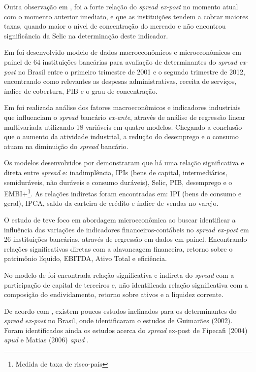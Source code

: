 \documentclass[
  12pt,
  12pt,
  openright,
  oneside,
  a4paper,
  chapter=TITLE,
  section=TITLE,
  subsection=TITLE,
  subsubsection=TITLE,
  english,
  portugues,
  sumario=tradicional]{abntex2}
\begin{document}
Outra observação em \textcite{dantas:2012}, foi a forte relação do \emph{spread} \emph{ex-post} no momento atual com o momento anterior imediato, e que as instituições tendem a cobrar maiores taxas, quando maior o nível de concentração do mercado e não encontrou significância da Selic na determinação deste indicador.

Em \textcite{almeida:2013} foi desenvolvido modelo de dados macroeconômicos e microeconômicos em painel de 64 instituições bancárias para avaliação de determinantes do \emph{spread} \emph{ex-post} no Brasil entre o primeiro trimestre de 2001 e o segundo trimestre de 2012, encontrando como relevantes as despesas administrativas, receita de serviços, índice de cobertura, PIB e o grau de concentração.

Em \textcite{durigan:2018} foi realizada análise dos fatores macroeconômicos e indicadores industriais que influenciam o \emph{spread} bancário \emph{ex-ante}, através de análise de regressão linear multivariada utilizando 18 variáveis em quatro modelos. Chegando a conclusão que o aumento da atividade industrial, a redução
do desemprego e o consumo atuam na diminuição do \emph{spread} bancário.

Os modelos desenvolvidos por \textcite{durigan:2018} demonstraram que há uma relação significativa e direta entre \emph{spread} e: inadimplência, IPIs (bens de capital, intermediários, semiduráveis, não duráveis e consumo duráveis), Selic, PIB, desemprego e o EMBI+\footnote{Medida de taxa de risco-país}. As relações indiretas foram encontradas em: IPI (bens de consumo e geral), IPCA, saldo da carteira de crédito e índice de vendas no varejo.

O estudo de \textcite{timotio:2018} teve foco em abordagem microeconômica ao buscar identificar a influência das variações de indicadores financeiros-contábeis no \emph{spread ex-post} em 26 instituições bancárias, através de regressão em dados em painel. Encontrando relações significativas diretas com a alavancagem financeira, retorno sobre o patrimônio líquido, EBITDA, Ativo Total e eficiência.

No modelo de \textcite{timotio:2018} foi encontrada relação significativa e indireta do \emph{spread} com a participação de capital de terceiros e, não identificada relação significativa com a composição do endividamento, retorno sobre ativos e a liquidez corrente.

De acordo com \textcite{durigan:2018, dantas:2012}, existem poucos estudos inclinados para os determinantes do \emph{spread} \emph{ex-post} no Brasil, onde identificaram o estudos de Guimarães (2002). Foram identificados ainda os estudos acerca do \emph{spread} ex-post de Fipecafi (2004) \emph{apud} \textcite{dantas:2012} e Matias (2006) \emph{apud} \textcite{leal:2006}.
\end{document}
